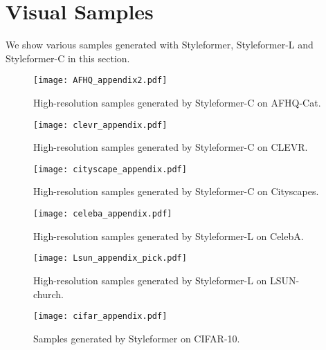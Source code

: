 \documentclass[10pt,twocolumn,letterpaper]{article}
\begin{document}
\section{Visual Samples}
We show various samples generated with Styleformer, Styleformer-L and Styleformer-C in this section.
\label{app:G}


\begin{figure*}[t]
\begin{center}
\texttt{[image: AFHQ\_appendix2.pdf]}
\end{center}
\vspace{-5mm}
\caption{High-resolution samples generated by Styleformer-C on AFHQ-Cat.
}
\vspace{-3mm}
\label{fig:afhq_app}
\end{figure*}

\begin{figure*}[t]
\begin{center}
\texttt{[image: clevr\_appendix.pdf]}
\end{center}
\vspace{-5mm}
\caption{High-resolution samples generated by Styleformer-C on CLEVR.
}
\vspace{-3mm}
\label{fig:clevr_app}
\end{figure*}



\begin{figure*}[t]
\begin{center}
\texttt{[image: cityscape\_appendix.pdf]}
\end{center}
\vspace{-5mm}
\caption{High-resolution samples generated by Styleformer-C on Cityscapes.
}
\vspace{-3mm}
\label{fig:cityscape_app}
\end{figure*}


\begin{figure*}[t]
\begin{center}
\texttt{[image: celeba\_appendix.pdf]}
\end{center}
\vspace{-5mm}
\caption{High-resolution samples generated by Styleformer-L on CelebA.
}
\vspace{-3mm}
\label{fig:celeba_app}
\end{figure*}

\begin{figure*}[t]
\begin{center}
\texttt{[image: Lsun\_appendix\_pick.pdf]}
\end{center}
\vspace{-5mm}
\caption{High-resolution samples generated by Styleformer-L on LSUN-church.
}
\vspace{-3mm}
\label{fig:lsun_app}
\end{figure*}

\begin{figure*}[t]
\begin{center}
\texttt{[image: cifar\_appendix.pdf]}
\end{center}
\vspace{-5mm}
\caption{Samples generated by Styleformer on CIFAR-10.
}
\vspace{-3mm}
\label{fig:cifar_app}
\end{figure*}
 
\end{document}
